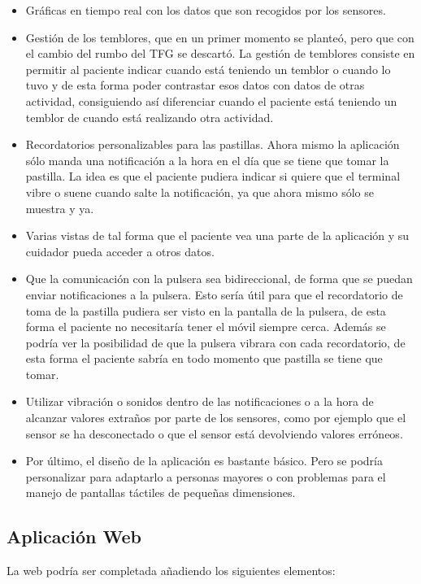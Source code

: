 \begin{itemize}
	\item Gráficas en tiempo real con los datos que son recogidos por los sensores.
    \item Gestión de los temblores, que en un primer momento se planteó, pero que con el cambio del rumbo del TFG se descartó. La gestión de temblores consiste en permitir al paciente indicar cuando está teniendo un temblor o cuando lo tuvo y de esta forma poder contrastar esos datos con datos de otras actividad, consiguiendo así diferenciar cuando el paciente está teniendo un temblor de cuando está realizando otra actividad.
    \item Recordatorios personalizables para las pastillas. Ahora mismo la aplicación sólo manda una notificación a la hora en el día que se tiene que tomar la pastilla. La idea es que el paciente pudiera indicar si quiere que el terminal vibre o suene cuando salte la notificación, ya que ahora mismo sólo se muestra y ya.
    \item Varias vistas de tal forma que el paciente vea una parte de la aplicación y su cuidador pueda acceder a otros datos.
    \item Que la comunicación con la pulsera sea bidireccional, de forma que se puedan enviar notificaciones a la pulsera. Esto sería útil para que el recordatorio de toma de la pastilla pudiera ser visto en la pantalla de la pulsera, de esta forma el paciente no necesitaría tener el móvil siempre cerca. Además se podría ver la posibilidad de que la pulsera vibrara con cada recordatorio, de esta forma el paciente sabría en todo momento que pastilla se tiene que tomar.
    \item Utilizar vibración o sonidos dentro de las notificaciones o a la hora de alcanzar valores extraños por parte de los sensores, como por ejemplo que el sensor se ha desconectado o que el sensor está devolviendo valores erróneos.
    \item Por último, el diseño de la aplicación es bastante básico. Pero se podría personalizar para adaptarlo a personas mayores o con problemas para el manejo de pantallas táctiles de pequeñas dimensiones.
\end{itemize}

\subsection{Aplicación Web}
La web podría ser completada añadiendo los siguientes elementos:

